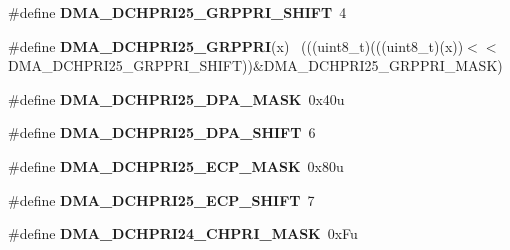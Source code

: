 \begin{DoxyCompactItemize}
\item 
\hypertarget{group___d_m_a___register___masks_ga2872078bc092ed52d5e7af657be4d9b8}{}\#define {\bfseries D\+M\+A\+\_\+\+D\+C\+H\+P\+R\+I25\+\_\+\+G\+R\+P\+P\+R\+I\+\_\+\+S\+H\+I\+F\+T}~4\label{group___d_m_a___register___masks_ga2872078bc092ed52d5e7af657be4d9b8}

\item 
\hypertarget{group___d_m_a___register___masks_gacb086f6885d2dfc27e5159906cbd914f}{}\#define {\bfseries D\+M\+A\+\_\+\+D\+C\+H\+P\+R\+I25\+\_\+\+G\+R\+P\+P\+R\+I}(x)                                  ~(((uint8\+\_\+t)(((uint8\+\_\+t)(x))$<$$<$D\+M\+A\+\_\+\+D\+C\+H\+P\+R\+I25\+\_\+\+G\+R\+P\+P\+R\+I\+\_\+\+S\+H\+I\+F\+T))\&D\+M\+A\+\_\+\+D\+C\+H\+P\+R\+I25\+\_\+\+G\+R\+P\+P\+R\+I\+\_\+\+M\+A\+S\+K)\label{group___d_m_a___register___masks_gacb086f6885d2dfc27e5159906cbd914f}

\item 
\hypertarget{group___d_m_a___register___masks_gafd39c610ee103ee8d2e20bb7c5236c9b}{}\#define {\bfseries D\+M\+A\+\_\+\+D\+C\+H\+P\+R\+I25\+\_\+\+D\+P\+A\+\_\+\+M\+A\+S\+K}~0x40u\label{group___d_m_a___register___masks_gafd39c610ee103ee8d2e20bb7c5236c9b}

\item 
\hypertarget{group___d_m_a___register___masks_gadea2b05025dd12a4cf5c118a4b04a6c0}{}\#define {\bfseries D\+M\+A\+\_\+\+D\+C\+H\+P\+R\+I25\+\_\+\+D\+P\+A\+\_\+\+S\+H\+I\+F\+T}~6\label{group___d_m_a___register___masks_gadea2b05025dd12a4cf5c118a4b04a6c0}

\item 
\hypertarget{group___d_m_a___register___masks_gabfef1a8f6352498df718a42f1c6eec76}{}\#define {\bfseries D\+M\+A\+\_\+\+D\+C\+H\+P\+R\+I25\+\_\+\+E\+C\+P\+\_\+\+M\+A\+S\+K}~0x80u\label{group___d_m_a___register___masks_gabfef1a8f6352498df718a42f1c6eec76}

\item 
\hypertarget{group___d_m_a___register___masks_gaf5208b492320b60adfdc141575fba481}{}\#define {\bfseries D\+M\+A\+\_\+\+D\+C\+H\+P\+R\+I25\+\_\+\+E\+C\+P\+\_\+\+S\+H\+I\+F\+T}~7\label{group___d_m_a___register___masks_gaf5208b492320b60adfdc141575fba481}

\item 
\hypertarget{group___d_m_a___register___masks_ga495d36d466cbe6aba3957e131705b3be}{}\#define {\bfseries D\+M\+A\+\_\+\+D\+C\+H\+P\+R\+I24\+\_\+\+C\+H\+P\+R\+I\+\_\+\+M\+A\+S\+K}~0x\+Fu\label{group___d_m_a___register___masks_ga495d36d466cbe6aba3957e131705b3be}


\end{DoxyCompactItemize}
